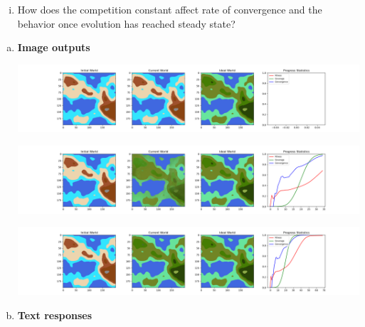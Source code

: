 \documentclass[11pt]{article}
\begin{document}
\begin{problems}
\begin{problem}
\begin{enumerate}[(a)]
\begin{enumerate}[(i)]
            \item How does the competition constant affect rate of convergence and the behavior once evolution has reached steady state?

            \begin{solution}
                
            \end{solution}
        \end{enumerate}
    \end{enumerate}
        
    \end{problem}
    
    \clearpage
    
    \item \begin{problem}

    \begin{enumerate}[(a)]
        \item \textbf{Image outputs}
        
        \begin{center}
        \includegraphics[width=\linewidth]{outputs/q4_frame0.png}
        
        \includegraphics[width=\linewidth]{outputs/q4_frame35.png}
        
        \includegraphics[width=\linewidth]{outputs/q4_frame69.png}
        \end{center}

        \item \textbf{Text responses}


\end{enumerate}
\end{problem}
\end{problems}
\end{document}
